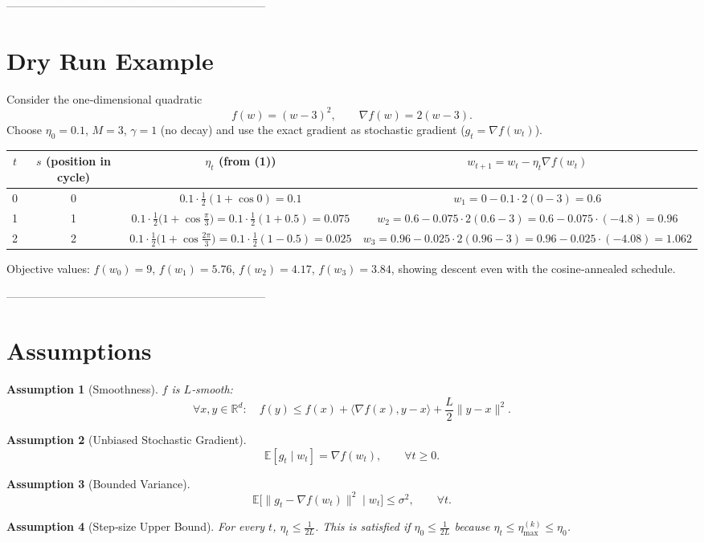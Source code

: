 \documentclass{article}
\newtheorem{assumption}{Assumption}
\newcommand{\E}{\mathbb{E}}
\newcommand{\R}{\mathbb{R}}
\begin{document}
---------------------------------------------------------------------

\section*{Dry Run Example}
Consider the one‑dimensional quadratic
\[
f(w)=(w-3)^2,\qquad \nabla f(w)=2(w-3).
\]
Choose $\eta_0=0.1$, $M=3$, $\gamma=1$ (no decay) and use the exact gradient
as stochastic gradient ($g_t=\nabla f(w_t)$).

\begin{center}
\begin{tabular}{c|c|c|c}
$t$ & $s$ (position in cycle) & $\eta_t$ (from (1)) & $w_{t+1}=w_t-\eta_t\nabla f(w_t)$ \\ \hline
0 & 0 & $0.1\cdot\frac12(1+\cos0)=0.1$ & $w_1=0-0.1\cdot 2(0-3)=0.6$ \\
1 & 1 & $0.1\cdot\frac12\!\bigl(1+\cos\frac{\pi}{3}\bigr)=0.1\cdot\frac12(1+0.5)=0.075$ &
$w_2=0.6-0.075\cdot2(0.6-3)=0.6-0.075\cdot(-4.8)=0.96$ \\
2 & 2 & $0.1\cdot\frac12\!\bigl(1+\cos\frac{2\pi}{3}\bigr)=0.1\cdot\frac12(1-0.5)=0.025$ &
$w_3=0.96-0.025\cdot2(0.96-3)=0.96-0.025\cdot(-4.08)=1.062$ 
\end{tabular}
\end{center}

Objective values: $f(w_0)=9$, $f(w_1)=5.76$, $f(w_2)=4.17$, $f(w_3)=3.84$,
showing descent even with the cosine‑annealed schedule.

---------------------------------------------------------------------

\section*{Assumptions}
\begin{assumption}[Smoothness]
$f$ is $L$‑smooth:
\[
\forall x,y\in\R^{d}:\quad 
f(y)\le f(x)+\langle\nabla f(x),y-x\rangle+\frac{L}{2}\|y-x\|^{2}.
\tag{A1}
\]
\end{assumption}
\begin{assumption}[Unbiased Stochastic Gradient]
\[
\E[g_t\mid w_t]=\nabla f(w_t),\qquad 
\forall t\ge0. \tag{A2}
\]
\end{assumption}
\begin{assumption}[Bounded Variance]
\[
\E\bigl[\|g_t-\nabla f(w_t)\|^{2}\mid w_t\bigr]\le\sigma^{2},
\qquad\forall t. \tag{A3}
\]
\end{assumption}
\begin{assumption}[Step‑size Upper Bound]
For every $t$, $\eta_t\le\frac{1}{2L}$.  This is satisfied if
$\eta_0\le\frac{1}{2L}$ because $\eta_t\le\eta_{\max}^{(k)}\le\eta_0$. 
\end{assumption}
\end{document}
